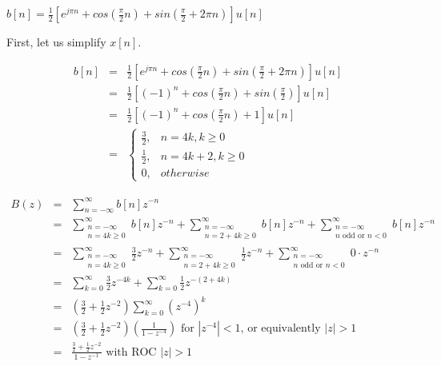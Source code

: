 \documentclass[11pt]{article}
\begin{document}
$b[n] = \frac{1}{2}\left[ e^{j\pi n} + cos\left(\frac{\pi}{2}n\right)+sin\left(\frac{\pi}{2}+2\pi n\right)\right] u[n]$

First, let us simplify $x[n]$.

\begin{eqnarray*}
b[n] &=& \frac{1}{2}\left[ e^{j\pi n} + cos\left(\frac{\pi}{2}n\right)+sin\left(\frac{\pi}{2}+2\pi n\right)\right] u[n] \\
&=& \frac{1}{2}\left[ (-1)^n + cos\left(\frac{\pi}{2}n\right)+sin\left(\frac{\pi}{2}\right)\right] u[n] \\
&=& \frac{1}{2}\left[ (-1)^n + cos\left(\frac{\pi}{2}n\right)+1 \right] u[n] \\
&=& \begin{cases}
\frac{3}{2}, & n=4k, k\geq 0 \\
\frac{1}{2}, & n=4k+2, k\geq 0 \\
0, & otherwise
\end{cases}
\end{eqnarray*}

\begin{eqnarray*}
B(z) &=& \sum_{n=-\infty}^\infty b[n] z^{-n} \\
&=& \sum_{\substack{n=-\infty \\ n=4k\geq 0}}^\infty b[n] z^{-n} + \sum_{\substack{n=-\infty \\ n=2+4k \geq 0}}^\infty b[n] z^{-n} + \sum_{\substack{n=-\infty \\ n \text{ odd or } n < 0}}^\infty b[n] z^{-n} \\
&=& \sum_{\substack{n=-\infty \\ n=4k\geq 0}}^\infty \frac{3}{2} z^{-n} + \sum_{\substack{n=-\infty \\ n=2+4k \geq 0}}^\infty \frac{1}{2} z^{-n} + \sum_{\substack{n=-\infty \\ n \text{ odd or } n < 0}}^\infty 0 \cdot z^{-n} \\
&=& \sum_{k=0}^\infty \frac{3}{2} z^{-4k} + \sum_{k=0}^\infty \frac{1}{2} z^{-(2+4k)}  \\
&=& \left(\frac{3}{2} + \frac{1}{2}z^{-2} \right) \sum_{k=0}^\infty (z^{-4})^k  \\
&=& \left(\frac{3}{2} + \frac{1}{2}z^{-2} \right) \left(\frac{1}{1-z^{-4}} \right) \text{ for }|z^{-4}| < 1 \text{, or equivalently } |z|>1\\
&=& \frac{\frac{3}{2}+\frac{1}{2}z^{-2}}{1-z^{-1}} \text{ with ROC } |z| > 1\\
\end{eqnarray*}
\end{document}
